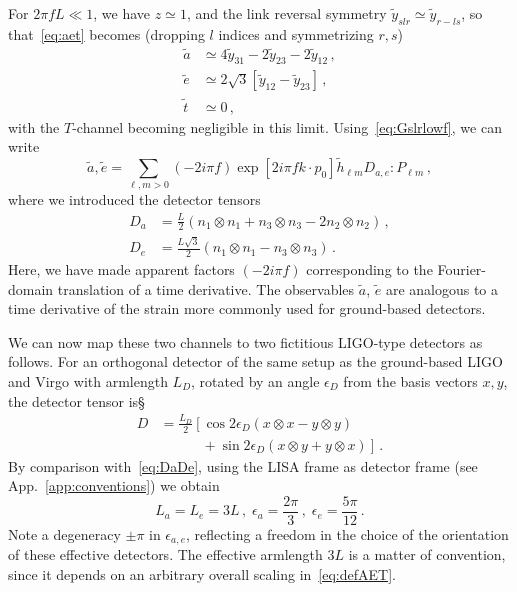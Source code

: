 \documentclass[aps,showpacs,twocolumn,prd,superscriptaddress,nofootinbib]{revtex4-1}
\newcommand{\be}{\begin{equation}}
\newcommand{\ee}{\end{equation}}
\newcommand{\bsub}{\begin{subequations}}
\newcommand{\esub}{\end{subequations}}
\newcommand{\nn}{\nonumber}
\begin{document}
For $2\pi f L \ll 1$, we have $z\simeq 1$, and the link reversal symmetry $\tilde{y}_{slr} \simeq \tilde{y}_{r-ls}$, so that~\eqref{eq:aet} becomes (dropping $l$ indices and symmetrizing $r,s$)
\bsub\label{eq:aetlowf}
\begin{align}
	\tilde{a} &\simeq 4\tilde{y}_{31} - 2 \tilde{y}_{23} - 2 \tilde{y}_{12} \,,\\
	\tilde{e} &\simeq 2\sqrt{3} \left[ \tilde{y}_{12}  - \tilde{y}_{23} \right] \,,\\
	\tilde{t} &\simeq 0 \,,
\end{align}
\esub
with the $T$-channel becoming negligible in this limit. Using~\eqref{eq:Gslrlowf}, we can write
\be\label{eq:aelowfmodes}
	\tilde{a}, \tilde{e} = \sum_{\ell, m>0} (-2i\pi f) \exp\left[ 2 i \pi f k\cdot p_{0} \right] \tilde{h}_{\ell m} D_{a,e} : P_{\ell m} \,,
\ee
where we introduced the detector tensors
\bsub\label{eq:DaDe}
\begin{align}
	D_{a} &= \frac{L}{2} \left( n_{1}\otimes n_{1} + n_{3} \otimes n_{3} - 2 n_{2} \otimes n_{2} \right) \,,\\
	D_{e} &= \frac{L\sqrt{3}}{2} \left( n_{1} \otimes n_{1} - n_{3} \otimes n_{3} \right) \,.
\end{align}
\esub
Here, we have made apparent factors $(-2i\pi f)$ corresponding to the Fourier-domain translation of a time derivative. The observables $\tilde{a}$, $\tilde{e}$ are analogous to a time derivative of the strain more commonly used for ground-based detectors.

We can now map these two channels to two fictitious LIGO-type detectors as follows. For an orthogonal detector of the same setup as the ground-based LIGO and Virgo with armlength $L_{D}$, rotated by an angle $\epsilon_{D}$ from the basis vectors $x,y$, the detector tensor is\S
\begin{align}
	D &= \frac{L_{D}}{2} \left[ \cos 2\epsilon_{D} \left( x\otimes x - y\otimes y \right) \right. \nn\\
	& \qquad\quad + \left. \sin 2\epsilon_{D} \left( x\otimes y + y \otimes x\right) \right] \,.
\end{align}
By comparison with~\eqref{eq:DaDe}, using the LISA frame as detector frame (see App.~\ref{app:conventions}) we obtain
\be
	L_{a} = L_{e} = 3L \,, \; \epsilon_{a} = \frac{2\pi}{3} \,, \; \epsilon_{e} = \frac{5\pi}{12} \,.
\ee
Note a degeneracy $\pm \pi$ in $\epsilon_{a,e}$, reflecting a freedom in the choice of the orientation of these effective detectors. The effective armlength $3L$ is a matter of convention, since it depends on an arbitrary overall scaling in~\eqref{eq:defAET}.
\end{document}
